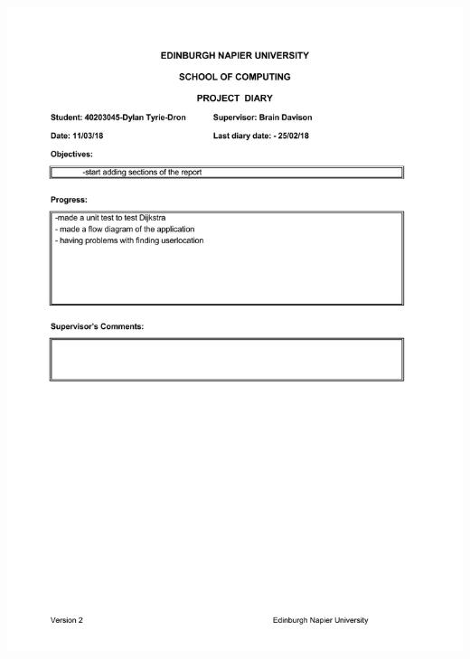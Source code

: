 \documentclass[12pt,a4paper]{article}
\begin{document}
\begin{appendices}
\includegraphics[width=\textwidth,height=\textheight,keepaspectratio]{project_diary_13th_entry.pdf}

\end{appendices}
\end{document}
